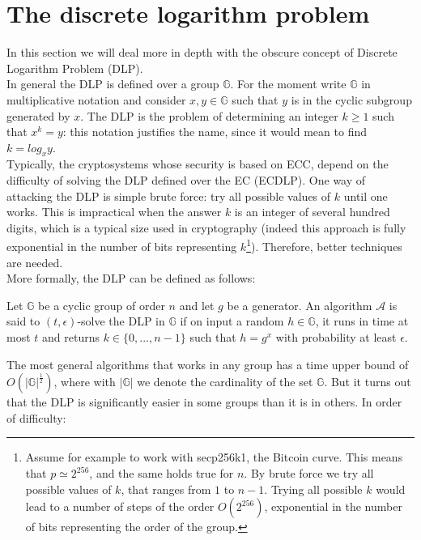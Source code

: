 \bigskip

\bigskip

\section{The discrete logarithm problem}
\label{dlp}
In this section we will deal more in depth with the obscure concept of Discrete Logarithm Problem (DLP).
\\
In general the DLP is defined over a group $\mathbb{G}$. For the moment write $\mathbb{G}$ in multiplicative notation and consider $x, y \in \mathbb{G}$ such that $y$ is in the cyclic subgroup generated by $x$. The DLP is the problem of determining an integer $k \geq 1$ such that $x^k = y$: this notation justifies the name, since it would mean to find $k = log_xy$.
\\
Typically, the cryptosystems whose security is based on ECC, depend on the difficulty of solving the DLP defined over the EC (ECDLP). One way of attacking the DLP is simple brute force: try all possible values of $k$ until one works. This is impractical when the answer $k$ is an integer of several hundred digits, which is a typical size used in cryptography (indeed this approach is fully exponential in the number of bits representing $k$\footnote{Assume for example to work with secp256k1, the Bitcoin curve. This means that $p \simeq 2^{256}$, and the same holds true for $n$. By brute force we try all possible values of $k$, that ranges from $1$ to $n-1$. Trying all possible $k$ would lead to a number of steps of the order $O(2^{256})$, exponential in the number of bits representing the order of the group.}). Therefore, better techniques are needed.
\\
More formally, the DLP can be defined as follows:
\begin{mydef}
	Let $\mathbb{G}$ be a cyclic group of order $n$ and let $g$ be a generator. An algorithm $\mathcal{A}$ is said to $(t, \epsilon)$-solve the DLP in $\mathbb{G}$ if on input a random $h \in \mathbb{G}$, it runs in time at most $t$ and returns $k \in \{0, ..., n - 1\}$ such that $h = g^x$ with probability at least $\epsilon$.
\end{mydef}
\noindent
The most general algorithms that works in any group has a time upper bound of $O(|\mathbb{G}|^{\frac{1}{2}})$, where with $|\mathbb{G}|$ we denote the cardinality of the set $\mathbb{G}$. But it turns out that the DLP is significantly easier in some groups than it is in others. In order of difficulty:
